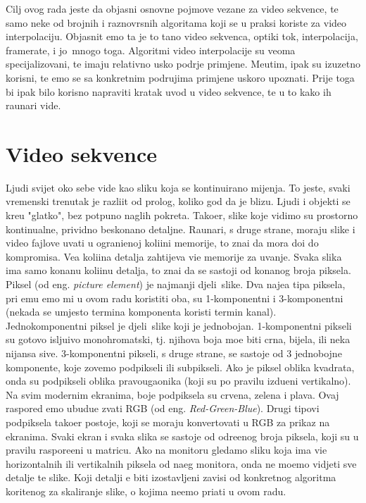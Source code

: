 Cilj ovog rada jeste da objasni osnovne pojmove vezane za video sekvence, te samo neke od brojnih i raznovrsnih algoritama koji se u praksi koriste za video interpolaciju. Objasnit \cj emo \sh ta je to ta\ch no video sekvenca, opti\ch ki tok,
interpolacija, framerate, i jo\sh\ mnogo toga. Algoritmi video interpolacije su veoma specijalizovani, te imaju relativno usko podr\ch je primjene. Me\dj utim, ipak su izuzetno korisni, te \cj emo se sa konkretnim podru\ch jima primjene uskoro
upoznati. Prije toga bi ipak bilo korisno napraviti kratak uvod u video sekvence, te u to kako ih ra\ch unari vide.

\section{Video sekvence}
Ljudi svijet oko sebe vide kao sliku koja se kontinuirano mijenja. To jeste, svaki vremenski trenutak je razli\ch it od pro\sh log, koliko god da je blizu. Ljudi i objekti se kre\cj u "glatko", bez potpuno naglih pokreta. Tako\dj er, slike koje vidimo
su prostorno kontinualne, prividno beskona\ch no detaljne. Ra\ch unari, s druge strane, moraju slike i video fajlove \ch uvati u ograni\ch enoj koli\ch ini memorije, \sh to zna\ch i da mora do\cj i do kompromisa. Ve\cj a koli\ch ina detalja
zahtijeva vi\sh e memorije za \ch uvanje. Svaka slika ima samo kona\ch nu koli\ch inu detalja, \sh to zna\ch i da se sastoji od kona\ch nog broja piksela. Piksel (od eng. \textit{picture element}) je najmanji djeli\cj\ slike. Dva naj\ch e\sh \cj a tipa piksela,
pri \ch emu \cj emo mi u ovom radu koristiti oba, su 1-komponentni i 3-komponentni (nekada se umjesto termina komponenta koristi termin kanal)\cite{wikivideo}. Jednokomponentni piksel je  djeli\cj\ slike koji je jednobojan. 1-komponentni pikseli su
gotovo islju\ch ivo monohromatski, tj. njihova boja mo\zh e biti crna, bijela, ili neka nijansa sive. 3-komponentni pikseli, s druge strane, se sastoje od 3 jednobojne komponente, koje zovemo podpikseli ili subpikseli. Ako je piksel oblika kvadrata,
onda su podpikseli oblika pravougaonika (koji su po pravilu izdu\zh eni vertikalno). Na svim modernim ekranima, boje podpiksela su crvena, zelena i plava. Ovaj raspored \cj emo ubudu\cj e zvati RGB (od eng. \textit{Red-Green-Blue}). Drugi tipovi podpiksela
 tako\dj er postoje, koji se moraju konvertovati u RGB za prikaz na ekranima.
Svaki ekran i svaka slika se sastoje od odre\dj enog broja piksela, koji su u pravilu raspore\dj eni u matricu. Ako na monitoru
gledamo sliku koja ima vi\sh e horizontalnih ili vertikalnih piksela od na\sh eg monitora, onda ne mo\zh emo vidjeti sve detalje te slike. Koji detalji \cj e biti izostavljeni zavisi od konkretnog algoritma kori\sh tenog za skaliranje slike, o kojima
ne\cj emo pri\ch ati u ovom radu.

